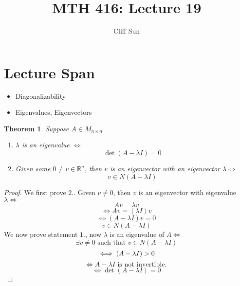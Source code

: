 \documentclass{article}
\title{MTH 416: Lecture 19}
\author{Cliff Sun}
\newtheorem{theorem}{Theorem}[section]
\newtheorem{one minute paper}[theorem]{One Minute Paper}
\begin{document}
\maketitle

\section*{Lecture Span}
\begin{itemize}
    \item Diagonalizability
    \item Eigenvalues, Eigenvectors
\end{itemize}


\begin{theorem}
    Suppose $A \in M_{n \times n}$
    \begin{enumerate}
        \item $\lambda$ is an eigenvalue $\iff$ 
        \begin{equation}
            \det(A - \lambda I) = 0
        \end{equation}
        \item Given some $0 \neq v \in \mathbb{R}^n$, then $v$ is an eigenvector with an eigenvector $\lambda \iff$
        \begin{equation}
            v \in N(A - \lambda I)
        \end{equation}
    \end{enumerate}
\end{theorem}

\begin{proof}
    We first prove $2.$. Given $v \neq 0$, then $v$ is an eigenvector with eigenvalue $\lambda \iff$
    \begin{equation}
        Av = \lambda v
    \end{equation} 
    \begin{equation}
        \iff Av = (\lambda I) v
    \end{equation}
    \begin{equation}
        \iff (A - \lambda I)v = 0
    \end{equation}
    \begin{equation}
        v \in N(A - \lambda I)
    \end{equation}
    We now prove statement $1.$, now $\lambda$ is an eigenvalue of $A \iff$
    \begin{equation}
        \exists v \neq 0 \text{ such that } v \in N(A - \lambda I)
    \end{equation} 
    \begin{equation}
        \iff \null(A - \lambda I) > 0
    \end{equation}
    \begin{equation}
        \iff A - \lambda I \text{ is not invertible. }
    \end{equation}
    \begin{equation}
        \iff \det(A - \lambda I) = 0
    \end{equation}
\end{proof}
\end{document}
